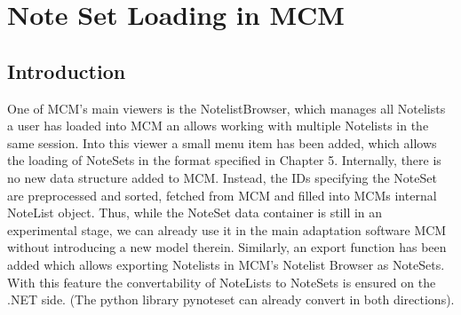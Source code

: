 \chapter{Note Set Loading in MCM}
\label{chap:nsgeneration}

\section{Introduction}

One of MCM's main viewers is the NotelistBrowser, which manages all Notelists a user has loaded into MCM an allows working with multiple Notelists in the same session. Into this viewer a small menu item has been added, which allows the loading of NoteSets in the format specified in Chapter 5. Internally, there is no new data structure added to MCM. Instead, the IDs specifying the NoteSet are preprocessed and sorted, fetched from MCM and filled into MCMs internal NoteList object. Thus, while the NoteSet data container is still in an experimental stage, we can already use it in the main adaptation software MCM without introducing a new model therein. Similarly, an export function has been added which allows exporting Notelists in MCM's Notelist Browser as NoteSets. With this feature the convertability of NoteLists to NoteSets is ensured on the .NET side. (The python library pynoteset can already convert in both directions).

